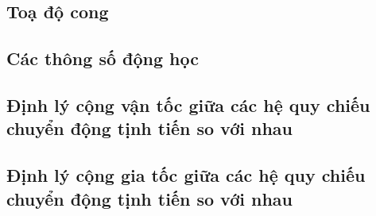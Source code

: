 \subsection{Toạ độ cong}
\subsection{Các thông số động học}
\subsection{Định lý cộng vận tốc giữa các hệ quy chiếu chuyển động tịnh tiến so với nhau}
\subsection{Định lý cộng gia tốc giữa các hệ quy chiếu chuyển động tịnh tiến so với nhau}